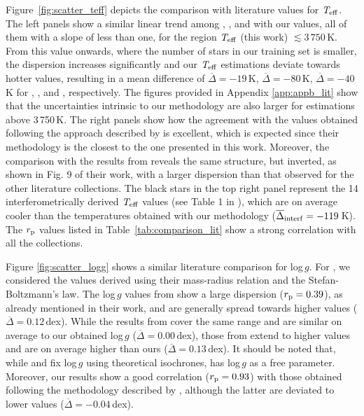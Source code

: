 Figure~\ref{fig:scatter_teff} depicts the comparison with literature values for $\textit{T}_{\rm eff}$. The left panels show a similar linear trend among , , and  with our values, all of them with a slope of less than one, for the region $\textit{T}_{\rm eff}$ (this work) $\lesssim 3\,750$\,K. From this value onwards, where the number of stars in our training set is smaller, the dispersion increases significantly and our $\textit{T}_{\rm eff}$ estimations deviate towards hotter values, resulting in a mean difference of $\overline{\Delta}=-19$\,K, $\overline{\Delta}=-80$\,K, $\overline{\Delta}=-40$\,K for , , and , respectively. The figures provided in Appendix \ref{app:appb_lit} show that the uncertainties intrinsic to our methodology are also larger for estimations above 3\,750\,K. The right panels show how the agreement with the values obtained following the approach described by  is excellent, which is expected since their methodology is the closest to the one presented in this work. Moreover, the comparison with the results from  reveals the same structure, but inverted, as shown in Fig. 9 of their work, with a larger dispersion than that observed for the other literature collections. The black stars in the top right panel represent the 14 interferometrically derived $\textit{T}_{\rm eff}$ values (see Table 1 in ), which are on average cooler than the temperatures obtained with our methodology ($\overline{\Delta}_{\rm interf}=-119$\,K). The $r_{\rm p}$ values listed in Table~\ref{tab:comparison_lit} show a strong correlation with all the collections.

Figure \ref{fig:scatter_logg} shows a similar literature comparison for log\,$\textit{g}$. For , we considered the values derived using their mass-radius relation and the Stefan-Boltzmann's law. The log\,$\textit{g}$ values from  show a large dispersion ($r_{\rm p}=0.39$), as already mentioned in their work, and are generally spread towards higher values ($\overline{\Delta}=0.12$\,dex). While the results from  cover the same range and are similar on average to our obtained log\,$\textit{g}$ ($\overline{\Delta}=0.00$\,dex), those from  extend to higher values and are on average higher than ours ($\overline{\Delta}=0.13$\,dex). It should be noted that, while  and  fix log\,$\textit{g}$ using theoretical isochrones,  has log\,$\textit{g}$ as a free parameter.
Moreover, our results show a good correlation ($r_{\rm p}=0.93$) with those obtained following the methodology described by , although the latter are deviated to lower values ($\overline{\Delta}=-0.04$\,dex).

